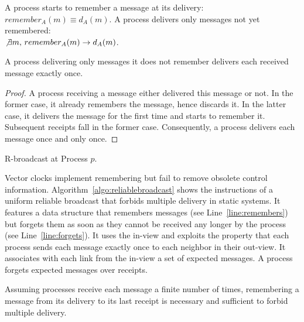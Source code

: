 \begin{definition}[Remembering]
  A process starts to remember a message at its delivery:
  $remember_A(m) \equiv d_A(m)$.  A process delivers only messages not yet
  remembered: \\ $\not\exists m,\, remember_A(m) \rightarrow d_A(m)$.
\end{definition}

\begin{theorem}
  A process delivering only messages it does not remember delivers each received
  message exactly once.
\end{theorem}

\begin{proof}
  A process receiving a message either delivered this message or not. In the
  former case, it already remembers the message, hence discards it. In the
  latter case, it delivers the message for the first time and starts to remember
  it. Subsequent receipts fall in the former case. Consequently, a process
  delivers each message once and only once.
\end{proof}

\begin{algorithm}[h]
  
  \caption{\label{algo:reliablebroadcast}R-broadcast at Process $p$.}
\end{algorithm}

Vector clocks implement remembering but fail to remove obsolete control
information.  Algorithm~\ref{algo:reliablebroadcast} shows the instructions of a
uniform reliable broadcast that forbids multiple delivery in static systems. It
features a data structure that remembers messages (see
Line~\ref{line:remembers}) but forgets them as soon as they cannot be received
any longer by the process (see Line~\ref{line:forgets}).  It uses the in-view
and exploits the property that each process sends each message exactly once to
each neighbor in their out-view. It associates with each link from the in-view a
set of expected messages. A process forgets expected messages over receipts.

\begin{theorem}[Forgetting]
  Assuming processes receive each message a finite number of times, remembering
  a message from its delivery to its last receipt is necessary and sufficient to
  forbid multiple delivery.
\end{theorem}

